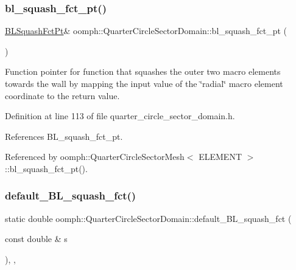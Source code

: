 \subsubsection{\texorpdfstring{bl\+\_\+squash\+\_\+fct\+\_\+pt()}{bl\_squash\_fct\_pt()}}
{\footnotesize\ttfamily \hyperlink{classoomph_1_1QuarterCircleSectorDomain_a6cffab57f87c9f4ab01744647240bb1e}{B\+L\+Squash\+Fct\+Pt}\& oomph\+::\+Quarter\+Circle\+Sector\+Domain\+::bl\+\_\+squash\+\_\+fct\+\_\+pt (\begin{DoxyParamCaption}{ }\end{DoxyParamCaption})\hspace{0.3cm}{\ttfamily [inline]}}



Function pointer for function that squashes the outer two macro elements towards the wall by mapping the input value of the \char`\"{}radial\char`\"{} macro element coordinate to the return value. 



Definition at line 113 of file quarter\+\_\+circle\+\_\+sector\+\_\+domain.\+h.



References B\+L\+\_\+squash\+\_\+fct\+\_\+pt.



Referenced by oomph\+::\+Quarter\+Circle\+Sector\+Mesh$<$ E\+L\+E\+M\+E\+N\+T $>$\+::bl\+\_\+squash\+\_\+fct\+\_\+pt().

\mbox{\label{classoomph_1_1QuarterCircleSectorDomain_adce1f0c6cf5405d6f8e9e6e0390d8c68}} 
\subsubsection{\texorpdfstring{default\+\_\+\+B\+L\+\_\+squash\+\_\+fct()}{default\_BL\_squash\_fct()}}
{\footnotesize\ttfamily static double oomph\+::\+Quarter\+Circle\+Sector\+Domain\+::default\+\_\+\+B\+L\+\_\+squash\+\_\+fct (\begin{DoxyParamCaption}\item[{const double \&}]{s }\end{DoxyParamCaption})\hspace{0.3cm}{\ttfamily [inline]}, {\ttfamily [static]}, {\ttfamily [private]}}




